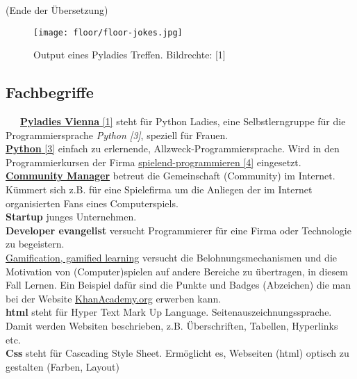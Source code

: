 \documentclass[10pt,a4paper,ngerman,twoside]{article} %
\begin{document}
(Ende der Übersetzung)
\begin{figure}
\texttt{[image: floor/floor-jokes.jpg]} \\
\caption{Output eines Pyladies Treffen. Bildrechte: [1]} 
\end{figure}
\subsection*{Fachbegriffe}

~~~\href{https://twitter.com/pyladies_vie}{\textbf{Pyladies Vienna} [1]} steht für Python Ladies, eine Selbstlerngruppe für die Programmiersprache  \textit{Python [3]}, speziell für Frauen. \\

\href{http://python.org}{\textbf{Python} [3]} einfach zu erlernende, Allzweck-Programmiersprache. Wird in den Programmierkursen der Firma \href{http://spielend-programmieren.at}{spielend-programmieren [4]} eingesetzt. \\

\href{http://de.wikipedia.org/wiki/Community_Management}{\textbf{Community Manager}} betreut die Gemeinschaft (Community) im Internet. Kümmert sich z.B. für eine Spielefirma um die Anliegen der im Internet organisierten Fans eines Computerspiels. \\

\textbf{Startup} junges Unternehmen. \\

\textbf{Developer evangelist} versucht Programmierer für eine Firma oder Technologie zu begeistern. \\

\href{https://de.wikipedia.org/wiki/Gamification}{Gamification, gamified learning} versucht die Belohnungsmechanismen und die Motivation von (Computer)spielen auf andere Bereiche zu übertragen, in diesem Fall Lernen. Ein Beispiel dafür sind die Punkte und Badges (Abzeichen) die man bei der Website \href{http://khanacademy.org}{KhanAcademy.org} erwerben kann. \\
 
\textbf{html} steht für Hyper Text Mark Up Language. Seitenauszeichnungssprache. Damit werden Websiten beschrieben, z.B. Überschriften, Tabellen, Hyperlinks etc. \\

\textbf{Css} steht für Cascading Style Sheet. Ermöglicht es, Webseiten (html) optisch zu gestalten (Farben, Layout) \\
\end{document}
